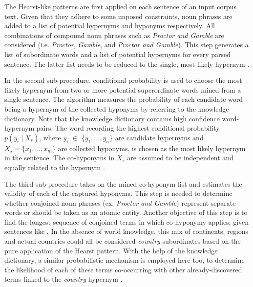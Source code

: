 The Hearst-like patterns are first applied on each sentence of an input corpus text.  Given that they adhere to some imposed constraints, noun phrases are added to a list of potential hypernyms and hyponyms respectively.  All combinations of compound noun phrases such as \textit{Proctor and Gamble} are considered (i.e. \textit{Proctor}, \textit{Gamble}, and \textit{Proctor and Gamble}).  This step generates a list of subordinate words and a list of potential hypernyms for every parsed sentence.  The latter list needs to be reduced to the single, most likely hypernym \citep{Wang2017}.

In the second sub-procedure, conditional probability is used to choose the most likely hypernym from two or more potential superordinate words mined from a single sentence.  The algorithm measures the probability of each candidate word being a hypernym of the collected hyponyms by referring to the knowledge dictionary.  Note that the knowledge dictionary contains high confidence word-hypernym pairs.  The word recording the highest conditional probability $p(y_i \mid X_s)$, where $y_i$ $\in$ $\{y_1,\ldots,y_n\}$ are candidate hypernyms and $X_s=\{x_1,\ldots, x_m\}$ are collected hyponyms, is chosen as the most likely hypernym in the sentence.  The co-hyponyms in \(X_s\) are assumed to be independent and equally related to the hypernym \citep{wu2012probase}.

The third sub-procedure takes on the mined co-hyponym list and estimates the validity of each of the captured hyponyms.  This step is needed to determine whether conjoined noun phrases (ex. \textit{Proctor and Gamble}) represent separate words or should be taken as an atomic entity.  Another objective of this step is to find the longest sequence of conjoined terms in which co-hyponymy applies, given sentences like .  In the absence of world knowledge, this mix of continents, regions and actual countries could all be considered \textit{country} subordinates based on the pure application of the Hearst pattern.  With the help of the knowledge dictionary, a similar probabilistic mechanism is employed here too, to determine the likelihood of each of these terms co-occurring with other already-discovered terms linked to the \textit{country} hypernym \citep{wu2012probase}.  


